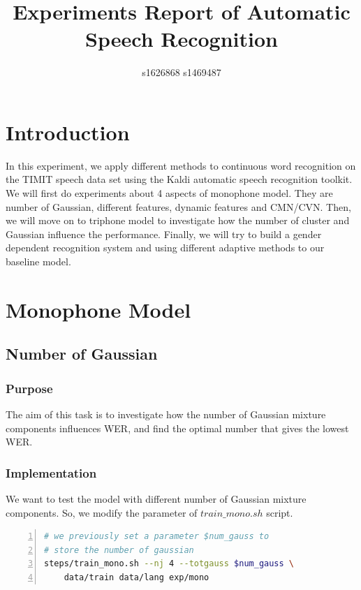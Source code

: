 \documentclass[]{article}
\begin{document}
\title{Experiments Report of Automatic Speech Recognition }
\author{s1626868   s1469487}
\maketitle
\begin{multicols*}{2}

\section{Introduction}

In this experiment, we apply different methods to continuous word recognition on the TIMIT speech data set using the Kaldi automatic speech recognition toolkit. We will first do experiments about 4 aspects of monophone model. They are number of Gaussian, different features, dynamic features and CMN/CVN. Then, we will move on to triphone model to investigate how the number of cluster and Gaussian influence the performance. Finally, we will try to build a gender dependent recognition system and using different adaptive methods to our baseline model.

\section{Monophone Model}
\subsection{Number of Gaussian}
\subsubsection{Purpose}
The aim of this task is to investigate how the number of Gaussian mixture components influences WER, and find the optimal number that gives the lowest WER. 

\subsubsection{Implementation}
We want to test the model with different number of Gaussian mixture components. So, we modify the parameter of $train\_mono.sh$ script.

\begin{lstlisting}[language=sh,showstringspaces=false,numbers=left,tabsize=4, xleftmargin=\parindent, frame=single, basicstyle=\tiny] 
# we previously set a parameter $num_gauss to
# store the number of gaussian 
steps/train_mono.sh --nj 4 --totgauss $num_gauss \
	data/train data/lang exp/mono
\end{lstlisting}


\end{multicols*}
\end{document}
